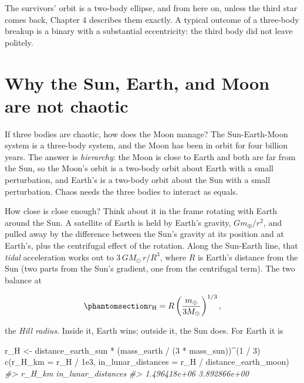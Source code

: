 \documentclass[
  10.5pt,
  letterpaper,
]{scrbook}
\newenvironment{Shaded}{\begin{snugshade}}{\end{snugshade}}
\newcommand{\AttributeTok}[1]{\textcolor[rgb]{0.00,0.00,0.00}{#1}}
\newcommand{\CommentTok}[1]{\textcolor[rgb]{0.00,0.00,0.00}{\textit{#1}}}
\newcommand{\DecValTok}[1]{\textcolor[rgb]{0.00,0.00,0.00}{#1}}
\newcommand{\FloatTok}[1]{\textcolor[rgb]{0.00,0.00,0.00}{#1}}
\newcommand{\FunctionTok}[1]{\textcolor[rgb]{0.00,0.00,0.00}{#1}}
\newcommand{\NormalTok}[1]{\textcolor[rgb]{0.00,0.00,0.00}{#1}}
\newcommand{\OtherTok}[1]{\textcolor[rgb]{0.00,0.00,0.00}{#1}}
\newcommand{\SpecialCharTok}[1]{\textcolor[rgb]{0.00,0.00,0.00}{#1}}
\theoremstyle{definition}
\theoremstyle{plain}
\theoremstyle{remark}
\begin{document}
The survivors' orbit is a two-body ellipse, and from here on, unless the
third star comes back, Chapter 4 describes them exactly. A typical
outcome of a three-body breakup is a binary with a substantial
eccentricity: the third body did not leave politely.

\section{Why the Sun, Earth, and Moon are not
chaotic}\label{why-the-sun-earth-and-moon-are-not-chaotic}

If three bodies are chaotic, how does the Moon manage? The
Sun-Earth-Moon system is a three-body system, and the Moon has been in
orbit for four billion years. The answer is \emph{hierarchy}: the Moon
is close to Earth and both are far from the Sun, so the Moon's orbit is
a two-body orbit about Earth with a small perturbation, and Earth's is a
two-body orbit about the Sun with a small perturbation. Chaos needs the
three bodies to interact as equals.

How close is close enough? Think about it in the frame rotating with
Earth around the Sun. A satellite of Earth is held by Earth's gravity,
\(G m_\oplus / r^2\), and pulled away by the difference between the
Sun's gravity at its position and at Earth's, plus the centrifugal
effect of the rotation. Along the Sun-Earth line, that \emph{tidal}
acceleration works out to \(3\,G M_\odot\, r / R^3\), where \(R\) is
Earth's distance from the Sun (two parts from the Sun's gradient, one
from the centrifugal term). The two balance at

\begin{equation}\protect\phantomsection\label{eq-hill}{
r_{\mathrm{H}} = R\left(\frac{m_\oplus}{3 M_\odot}\right)^{1/3},
}\end{equation}

the \emph{Hill radius}. Inside it, Earth wins; outside it, the Sun does.
For Earth it is

\begin{Shaded}
\begin{Highlighting}[]
\NormalTok{r\_H }\OtherTok{\textless{}{-}}\NormalTok{ distance\_earth\_sun }\SpecialCharTok{*}\NormalTok{ (mass\_earth }\SpecialCharTok{/}\NormalTok{ (}\DecValTok{3} \SpecialCharTok{*}\NormalTok{ mass\_sun))}\SpecialCharTok{\^{}}\NormalTok{(}\DecValTok{1} \SpecialCharTok{/} \DecValTok{3}\NormalTok{)}
\FunctionTok{c}\NormalTok{(}\AttributeTok{r\_H\_km =}\NormalTok{ r\_H }\SpecialCharTok{/} \FloatTok{1e3}\NormalTok{, }\AttributeTok{in\_lunar\_distances =}\NormalTok{ r\_H }\SpecialCharTok{/}\NormalTok{ distance\_earth\_moon)}
\CommentTok{\#\textgreater{}             r\_H\_km in\_lunar\_distances }
\CommentTok{\#\textgreater{}       1.496418e+06       3.892866e+00}
\end{Highlighting}
\end{Shaded}
\end{document}

